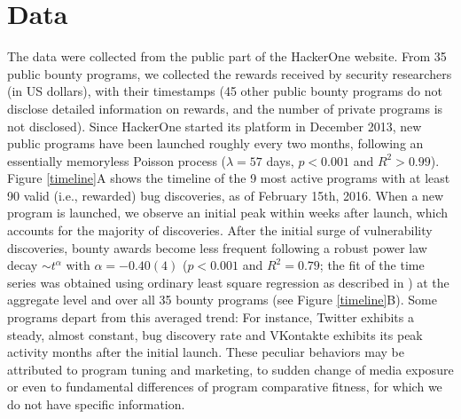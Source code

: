 \section{Data}
\label{sec:data}
The data were collected from the public part of the HackerOne website. From 35 public bounty programs, we collected the rewards received by security researchers (in US dollars), with their timestamps (45 other public bounty programs do not disclose detailed information on rewards, and the number of private programs is not disclosed). Since HackerOne started its platform in December 2013, new public programs have been launched roughly every two months, following an essentially memoryless Poisson process ($\lambda = 57$ days, $p < 0.001$ and $R^2 > 0.99$). Figure \ref{timeline}A shows the timeline of the 9 most active programs with at least 90 valid (i.e., rewarded) bug discoveries, as of February 15th, 2016. When a new program is launched, we observe an initial peak within weeks after launch, which accounts for the majority of discoveries. After the initial surge of vulnerability discoveries, bounty awards become less frequent following a robust power law decay $\sim t^{\alpha}$ with $\alpha = -0.40(4)$ ($p < 0.001$ and $R^2 = 0.79$; the fit of the time series was obtained using ordinary least square regression as described in \cite{maillart2011quantification}) at the aggregate level and over all 35 bounty programs (see Figure \ref{timeline}B). Some programs depart from this averaged trend: For instance, Twitter exhibits a steady, almost constant, bug discovery rate and VKontakte exhibits its peak activity months after the initial launch. These peculiar behaviors may be attributed to program tuning and marketing, to sudden change of media exposure or even to fundamental differences of program comparative fitness, for which we do not have specific information.\\

